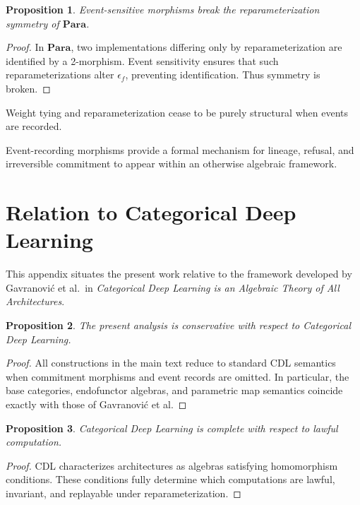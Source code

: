 \documentclass[11pt]{article}
\newtheorem{proposition}{Proposition}
\begin{document}
\begin{proposition}
Event-sensitive morphisms break the reparameterization symmetry of
$\mathbf{Para}$.
\end{proposition}

\begin{proof}
In $\mathbf{Para}$, two implementations differing only by reparameterization are
identified by a 2-morphism. Event sensitivity ensures that such
reparameterizations alter $\epsilon_f$, preventing identification. Thus
symmetry is broken.
\end{proof}

\begin{corollary}
Weight tying and reparameterization cease to be purely structural when events
are recorded.
\end{corollary}

Event-recording morphisms provide a formal mechanism for lineage, refusal, and
irreversible commitment to appear within an otherwise algebraic framework.

\section{Relation to Categorical Deep Learning}

This appendix situates the present work relative to the framework developed by
Gavranović et al.\ in \emph{Categorical Deep Learning is an Algebraic Theory of All
Architectures}.

\begin{proposition}
The present analysis is conservative with respect to Categorical Deep Learning.
\end{proposition}

\begin{proof}
All constructions in the main text reduce to standard CDL semantics when
commitment morphisms and event records are omitted. In particular, the base
categories, endofunctor algebras, and parametric map semantics coincide exactly
with those of Gavranović et al.
\end{proof}

\begin{proposition}
Categorical Deep Learning is complete with respect to lawful computation.
\end{proposition}

\begin{proof}
CDL characterizes architectures as algebras satisfying homomorphism conditions.
These conditions fully determine which computations are lawful, invariant, and
replayable under reparameterization.
\end{proof}
\end{document}
